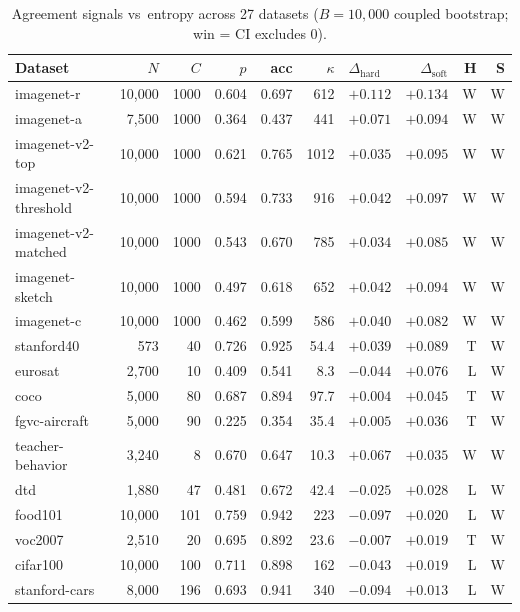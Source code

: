 \documentclass[a4paper,fleqn]{cas-sc}
\begin{document}
\begin{table}[t]
\centering
\caption{Agreement signals vs~entropy across 27 datasets ($B{=}10{,}000$ coupled bootstrap; win = CI excludes 0).}
\label{tab:meta_results}
\small
\begin{tabular}{lrrrrrlrrr}
\toprule
Dataset & $N$ & $C$ & $p$ & acc & $\kappa$ & $\Delta_{\text{hard}}$ & $\Delta_{\text{soft}}$ & H & S \\
\midrule
imagenet-r         & 10,000 & 1000 & 0.604 & 0.697 &  612 & $+0.112$ & $+0.134$ & W & W \\
imagenet-a         &  7,500 & 1000 & 0.364 & 0.437 &  441 & $+0.071$ & $+0.094$ & W & W \\
imagenet-v2-top    & 10,000 & 1000 & 0.621 & 0.765 & 1012 & $+0.035$ & $+0.095$ & W & W \\
imagenet-v2-threshold & 10,000 & 1000 & 0.594 & 0.733 & 916 & $+0.042$ & $+0.097$ & W & W \\
imagenet-v2-matched & 10,000 & 1000 & 0.543 & 0.670 & 785 & $+0.034$ & $+0.085$ & W & W \\
imagenet-sketch    & 10,000 & 1000 & 0.497 & 0.618 & 652 & $+0.042$ & $+0.094$ & W & W \\
imagenet-c         & 10,000 & 1000 & 0.462 & 0.599 & 586 & $+0.040$ & $+0.082$ & W & W \\
stanford40         &    573 &   40 & 0.726 & 0.925 & 54.4 & $+0.039$ & $+0.089$ & T & W \\
eurosat            &  2,700 &   10 & 0.409 & 0.541 &  8.3 & $-0.044$ & $+0.076$ & L & W \\
coco               &  5,000 &   80 & 0.687 & 0.894 & 97.7 & $+0.004$ & $+0.045$ & T & W \\
fgvc-aircraft      &  5,000 &   90 & 0.225 & 0.354 & 35.4 & $+0.005$ & $+0.036$ & T & W \\
teacher-behavior   &  3,240 &    8 & 0.670 & 0.647 & 10.3 & $+0.067$ & $+0.035$ & W & W \\
dtd                &  1,880 &   47 & 0.481 & 0.672 & 42.4 & $-0.025$ & $+0.028$ & L & W \\
food101            & 10,000 &  101 & 0.759 & 0.942 &  223 & $-0.097$ & $+0.020$ & L & W \\
voc2007            &  2,510 &   20 & 0.695 & 0.892 & 23.6 & $-0.007$ & $+0.019$ & T & W \\
cifar100           & 10,000 &  100 & 0.711 & 0.898 &  162 & $-0.043$ & $+0.019$ & L & W \\
stanford-cars      &  8,000 &  196 & 0.693 & 0.941 &  340 & $-0.094$ & $+0.013$ & L & W \\

\end{tabular}
\end{table}
\end{document}
